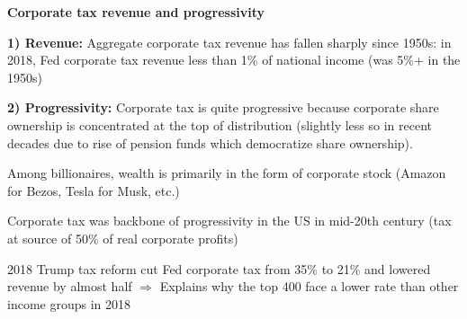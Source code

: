 \documentclass[landscape]{slides}
\begin{document}
\begin{slide}
\begin{center}
{\bf Corporate tax revenue and progressivity}
\end{center}

\textbf{1) Revenue:} Aggregate corporate tax revenue has fallen sharply since 1950s: in 2018, Fed corporate tax revenue
less than 1\% of national income (was 5\%+ in the 1950s)

\textbf{2) Progressivity:}  Corporate tax is quite progressive because corporate share ownership is concentrated at the top of
distribution (slightly less so in recent decades due to rise of pension funds which democratize share ownership).

Among billionaires, wealth is primarily in the form of corporate stock (Amazon for Bezos, Tesla for Musk, etc.)

Corporate tax was backbone of progressivity in the US in mid-20th century (tax at source of 50\% of real corporate profits)

2018 Trump tax reform cut Fed corporate tax from 35\% to 21\% and lowered revenue by almost half $\Rightarrow$ Explains why
the top 400 face a lower rate than other income groups in 2018



\end{slide}

\begin{slide}

\end{slide}



%
%
%
%
%
%
%
%
%
%
%
%
%
\end{document}
